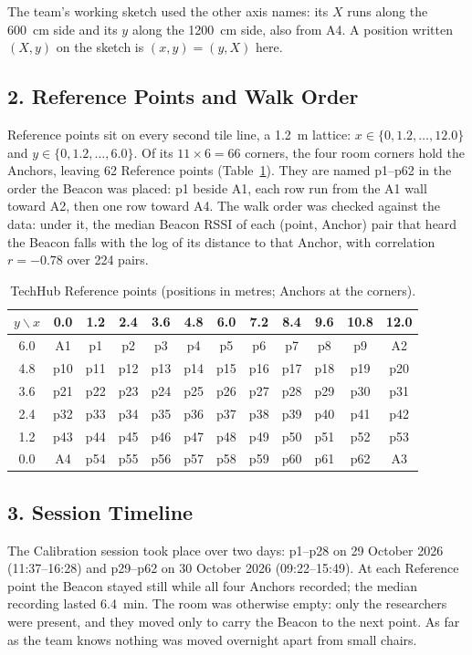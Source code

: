 The team's working sketch used the other axis names: its $X$ runs along the 600~cm side and its $y$ along the 1200~cm side, also from A4. A position written $(X, y)$ on the sketch is $(x, y) = (y, X)$ here.

\subsection*{2. Reference Points and Walk Order}
Reference points sit on every second tile line, a 1.2~m lattice: $x \in \{0, 1.2, \dots, 12.0\}$ and $y \in \{0, 1.2, \dots, 6.0\}$. Of its $11 \times 6 = 66$ corners, the four room corners hold the Anchors, leaving 62 Reference points (Table~\ref{tab:techhub-grid}). They are named p1--p62 in the order the Beacon was placed: p1 beside A1, each row run from the A1 wall toward A2, then one row toward A4. The walk order was checked against the data: under it, the median Beacon RSSI of each (point, Anchor) pair that heard the Beacon falls with the log of its distance to that Anchor, with correlation $r = -0.78$ over 224 pairs.

\begin{table}[!t]
\centering
\caption{TechHub Reference points (positions in metres; Anchors at the corners).}
\label{tab:techhub-grid}
\footnotesize
\begin{tabular}{|c|ccccccccccc|}
\hline
$y \backslash x$ & 0.0 & 1.2 & 2.4 & 3.6 & 4.8 & 6.0 & 7.2 & 8.4 & 9.6 & 10.8 & 12.0 \\
\hline
6.0 & A1 & p1 & p2 & p3 & p4 & p5 & p6 & p7 & p8 & p9 & A2 \\
4.8 & p10 & p11 & p12 & p13 & p14 & p15 & p16 & p17 & p18 & p19 & p20 \\
3.6 & p21 & p22 & p23 & p24 & p25 & p26 & p27 & p28 & p29 & p30 & p31 \\
2.4 & p32 & p33 & p34 & p35 & p36 & p37 & p38 & p39 & p40 & p41 & p42 \\
1.2 & p43 & p44 & p45 & p46 & p47 & p48 & p49 & p50 & p51 & p52 & p53 \\
0.0 & A4 & p54 & p55 & p56 & p57 & p58 & p59 & p60 & p61 & p62 & A3 \\
\hline
\end{tabular}
\end{table}

\subsection*{3. Session Timeline}
The Calibration session took place over two days: p1--p28 on 29 October 2026 (11:37--16:28) and p29--p62 on 30 October 2026 (09:22--15:49). At each Reference point the Beacon stayed still while all four Anchors recorded; the median recording lasted 6.4~min. The room was otherwise empty: only the researchers were present, and they moved only to carry the Beacon to the next point. As far as the team knows nothing was moved overnight apart from small chairs.

